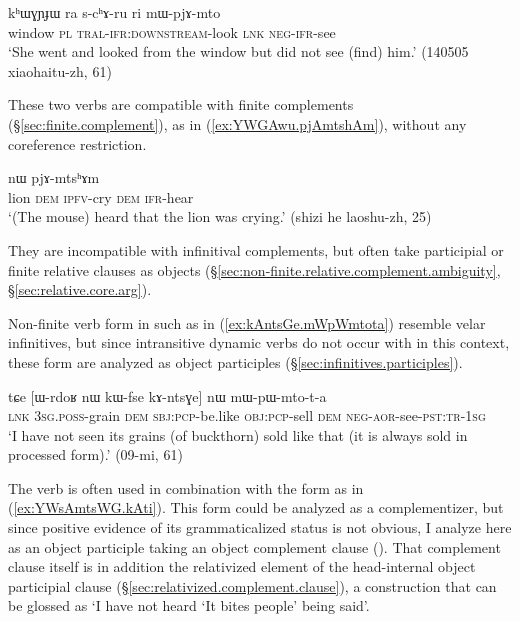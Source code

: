 \begin{exe}
\ex \label{ex:schAru.mWpjAmto}
 \gll kʰɯɣɲɟɯ ra s-cʰɤ-ru ri mɯ-pjɤ-mto \\
 window \textsc{pl} \textsc{tral}-\textsc{ifr}:\textsc{downstream}-look \textsc{lnk} \textsc{neg}-\textsc{ifr}-see \\
 \glt `She went and looked from the window but did not see (find) him.' (140505 xiaohaitu-zh, 61)
\end{exe}

These two verbs are compatible with finite complements (§\ref{sec:finite.complement}), as in (\ref{ex:YWGAwu.pjAmtshAm}), without any coreference restriction. 

\begin{exe}
\ex \label{ex:YWGAwu.pjAmtshAm}
  nɯ pjɤ-mtsʰɤm \\
 lion \textsc{dem} \textsc{ipfv}-cry \textsc{dem} \textsc{ifr}-hear \\
 \glt `(The mouse) heard that the lion was crying.' (shizi he laoshu-zh, 25)
\end{exe}

They are incompatible with infinitival complements, but often take participial or finite relative clauses as objects (§\ref{sec:non-finite.relative.complement.ambiguity}, §\ref{sec:relative.core.arg}). 

Non-finite verb form in  such as  in (\ref{ex:kAntsGe.mWpWmtota}) resemble velar infinitives, but since intransitive dynamic verbs do not occur with  in this context, these form are analyzed as object participles (§\ref{sec:infinitives.participles}).


\begin{exe}
\ex \label{ex:kAntsGe.mWpWmtota}
 \gll tɕe [ɯ-rdoʁ nɯ kɯ-fse kɤ-ntsɣe] nɯ mɯ-pɯ-mto-t-a  \\
 \textsc{lnk} \textsc{3sg}.\textsc{poss}-grain \textsc{dem} \textsc{sbj}:\textsc{pcp}-be.like \textsc{obj}:\textsc{pcp}-sell \textsc{dem} \textsc{neg}-\textsc{aor}-see-\textsc{pst}:\textsc{tr}-\textsc{1sg} \\
 \glt `I have not seen its grains (of buckthorn) sold like that (it is always sold in processed form).' (09-mi, 61)
\end{exe}

The verb  is often used in combination with the form  as in (\ref{ex:YWsAmtsWG.kAti}). This form could be analyzed as a complementizer, but since positive evidence of its grammaticalized status is not obvious, I analyze  here as an object participle taking an object complement clause (). That complement clause itself is in addition the relativized element of the head-internal object participial clause  (§\ref{sec:relativized.complement.clause}), a construction that can be glossed as `I have not heard `It bites people' being said'.

